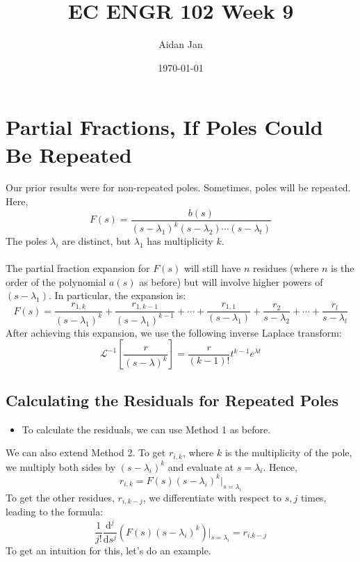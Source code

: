 \documentclass[10pt]{article}
\title{EC ENGR 102 Week 9}
\author{Aidan Jan}
\date{\today}
\newcommand{\laplace}{\mathcal{L}}
\newcommand{\dd}{\text{d}}
\begin{document}
\maketitle

\section*{Partial Fractions, If Poles Could Be Repeated}
Our prior results were for non-repeated poles.  Sometimes, poles will be repeated.  Here,
\[F(s) = \frac{b(s)}{(s - \lambda_1)^k (s - \lambda_2) \cdots (s - \lambda_t)}\]
The poles $\lambda_i$ are distinct, but $\lambda_1$ has multiplicity $k$.\\\\
The partial fraction expansion for $F(s)$ will still have $n$ residues (where $n$ is the order of the polynomial $a(s)$ as before) but will involve higher powers of $(s - \lambda_1)$.  In particular, the expansion is:
\[F(s) = \frac{r_{1, k}}{(s - \lambda_1)^k} + \frac{r_{1, k - 1}}{(s - \lambda_1)^{k - 1}} + \cdots + \frac{r_{1, 1}}{(s - \lambda_1)} + \frac{r_2}{s - \lambda_2} + \cdots + \frac{r_l}{s - \lambda_l}\]
After achieving this expansion, we use the following inverse Laplace transform:
\[\laplace^{-1} \left[\frac{r}{(s - \lambda)^k}\right] = \frac{r}{(k - 1)!} t^{k - 1} e^{\lambda t}\]

\subsection*{Calculating the Residuals for Repeated Poles}
\begin{itemize}
    \item To calculate the residuals, we can use Method 1 as before.
\end{itemize}
We can also extend Method 2.  To get $r_{i, k}$, where $k$ is the multiplicity of the pole, we multiply both sides by $(s - \lambda_i)^k$ and evaluate at $s = \lambda_i$.  Hence,
\[r_{i, k} = F(s)(s - \lambda_i)^k\bigg|_{s = \lambda_i}\]
To get the other residues, $r_{i, k - j}$, we differentiate with respect to $s, j$ times, leading to the formula:
\[\frac{1}{j!} \frac{\dd^j}{\dd s^j}(F(s)(s - \lambda_i)^k) \bigg|_{s = \lambda_i} = r_{i. k - j}\]
To get an intuition for this, let's do an example.
\end{document}
